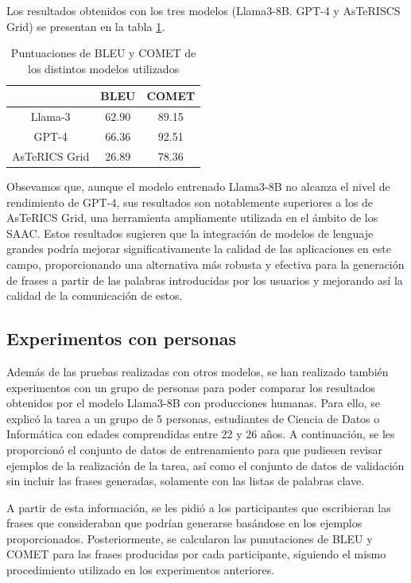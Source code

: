 \documentclass[11pt,spanish,listoffigures,listoftables]{tfgetsinf}
\begin{document}
Los resultados obtenidos con los tres modelos (Llama3-8B. GPT-4 y AsTeRISCS Grid) se presentan en la tabla \ref{tab:comparacionFinal}.

\begin{table}[!h]
\caption{Puntuaciones de BLEU y COMET de los distintos modelos utilizados}
\begin{center}
\begin{tabular}{ c | c c }
	\ & BLEU & COMET \\
	\hline
	\hline
	Llama-3 & 62.90 & 89.15  \\
	GPT-4 & 66.36 & 92.51\\
	AsTeRICS Grid & 26.89 & 78.36 \\

\end{tabular}
\end{center}
\label{tab:comparacionFinal}
\end{table}

Obsevamos que, aunque el modelo entrenado Llama3-8B no alcanza el nivel de rendimiento de GPT-4, sus resultados son notablemente superiores a los de AsTeRICS Grid, una herramienta ampliamente utilizada en el ámbito de los SAAC. Estos resultados sugieren que la integración de modelos de lenguaje grandes podría mejorar significativamente la calidad de las aplicaciones en este campo, proporcionando una alternativa más robusta y efectiva para la generación de frases a partir de las palabras introducidas por los usuarios y mejorando así la calidad de la comunicación de estos.

\subsection{Experimentos con personas}

Además de las pruebas realizadas con otros modelos, se han realizado también experimentos con un grupo de personas para poder comparar los resultados obtenidos por el modelo Llama3-8B con producciones humanas. Para ello, se explicó la tarea a un grupo de 5 personas, estudiantes de Ciencia de Datos o Informática con edades comprendidas entre 22 y 26 años. A continuación, se les proporcionó el conjunto de datos de entrenamiento para que pudiesen revisar ejemplos de la realización de la tarea, así como el conjunto de datos de validación sin incluir las frases generadas, solamente con las listas de palabras clave.

A partir de esta información, se les pidió a los participantes que escribieran las frases que consideraban que podrían generarse basándose en los ejemplos proporcionados. Posteriormente, se calcularon las punutaciones de BLEU y COMET para las frases producidas por cada participante, siguiendo el mismo procedimiento utilizado en los experimentos anteriores.
\end{document}
